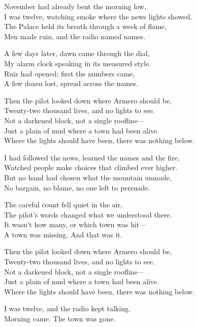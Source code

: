 \begin{lyrics}
November had already bent the morning low,\\
I was twelve, watching smoke where the news lights showed.\\
The Palace held its breath through a week of flame,\\
Men made ruin, and the radio named names.

A few days later, dawn came through the dial,\\
My alarm clock speaking in its measured style.\\
Ruiz had opened; first the numbers came,\\
A few dozen lost, spread across the names.

Then the pilot looked down where Armero should be,\\
Twenty-two thousand lives, and no lights to see.\\
Not a darkened block, not a single roofline—\\
Just a plain of mud where a town had been alive.\\
Where the lights should have been, there was nothing below.

I had followed the news, learned the names and the fire,\\
Watched people make choices that climbed ever higher.\\
But no hand had chosen what the mountain unmade,\\
No bargain, no blame, no one left to persuade.

The careful count fell quiet in the air,\\
The pilot’s words changed what we understood there.\\
It wasn’t how many, or which town was hit—\\
A town was missing. And that was it.

Then the pilot looked down where Armero should be,\\
Twenty-two thousand lives, and no lights to see.\\
Not a darkened block, not a single roofline—\\
Just a plain of mud where a town had been alive.\\
Where the lights should have been, there was nothing below.

I was twelve, and the radio kept talking.\\
Morning came. The town was gone.
\end{lyrics}

